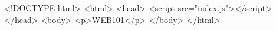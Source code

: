 <!DOCTYPE html>
<html>
    <head>
        <script src="index.js"></script>
    </head>
    <body>
        <p>WEB101</p>
    </body>
</html>